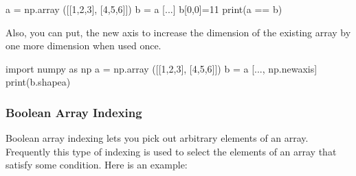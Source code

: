 \documentclass[
]{article}
\newenvironment{Shaded}{}{}
\newcommand{\BuiltInTok}[1]{#1}
\newcommand{\DecValTok}[1]{\textcolor[rgb]{0.25,0.63,0.44}{#1}}
\newcommand{\ImportTok}[1]{#1}
\newcommand{\NormalTok}[1]{#1}
\newcommand{\OperatorTok}[1]{\textcolor[rgb]{0.40,0.40,0.40}{#1}}
\begin{document}
\begin{Shaded}
\begin{Highlighting}[]
\NormalTok{a }\OperatorTok{=}\NormalTok{ np.array ([[}\DecValTok{1}\NormalTok{,}\DecValTok{2}\NormalTok{,}\DecValTok{3}\NormalTok{], [}\DecValTok{4}\NormalTok{,}\DecValTok{5}\NormalTok{,}\DecValTok{6}\NormalTok{]])}
\NormalTok{b }\OperatorTok{=}\NormalTok{ a [...]}
\NormalTok{b[}\DecValTok{0}\NormalTok{,}\DecValTok{0}\NormalTok{]}\OperatorTok{=}\DecValTok{11}
\BuiltInTok{print}\NormalTok{(a }\OperatorTok{==}\NormalTok{ b)}
\end{Highlighting}
\end{Shaded}

Also, you can put, the new axis to increase the dimension of the
existing array by one more dimension when used once.

\begin{Shaded}
\begin{Highlighting}[]
\ImportTok{import}\NormalTok{ numpy }\ImportTok{as}\NormalTok{ np}
\NormalTok{a }\OperatorTok{=}\NormalTok{ np.array ([[}\DecValTok{1}\NormalTok{,}\DecValTok{2}\NormalTok{,}\DecValTok{3}\NormalTok{], [}\DecValTok{4}\NormalTok{,}\DecValTok{5}\NormalTok{,}\DecValTok{6}\NormalTok{]])}
\NormalTok{b }\OperatorTok{=}\NormalTok{ a [..., np.newaxis]}
\BuiltInTok{print}\NormalTok{(b.shapea)}
\end{Highlighting}
\end{Shaded}

\hypertarget{boolean-array-indexing}{%
\subsubsection{Boolean Array Indexing}\label{boolean-array-indexing}}

Boolean array indexing lets you pick out arbitrary elements of an array.
Frequently this type of indexing is used to select the elements of an
array that satisfy some condition. Here is an example:
\end{document}
